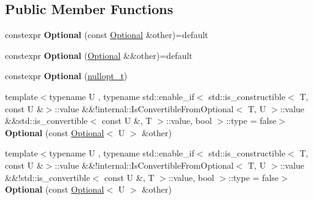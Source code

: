 \subsection*{Public Member Functions}
\begin{DoxyCompactItemize}
\item 
\mbox{\label{classv8_1_1base_1_1Optional_a40c311fae36751117f36cbe251bdbb6a}} 
constexpr {\bfseries Optional} (const \mbox{\hyperlink{classv8_1_1base_1_1Optional}{Optional}} \&other)=default
\item 
\mbox{\label{classv8_1_1base_1_1Optional_a4d5a0f84ed1678dc6647edc8127300c3}} 
constexpr {\bfseries Optional} (\mbox{\hyperlink{classv8_1_1base_1_1Optional}{Optional}} \&\&other)=default
\item 
\mbox{\label{classv8_1_1base_1_1Optional_aff776d9111417521b84aea3c36e5ff17}} 
constexpr {\bfseries Optional} (\mbox{\hyperlink{structv8_1_1base_1_1nullopt__t}{nullopt\+\_\+t}})
\item 
\mbox{\label{classv8_1_1base_1_1Optional_a4b6258b007a59720f13b3a0d7157b8bd}} 
{\footnotesize template$<$typename U , typename std\+::enable\+\_\+if$<$ std\+::is\+\_\+constructible$<$ T, const U \&$>$\+::value \&\&!internal\+::\+Is\+Convertible\+From\+Optional$<$ T, U $>$\+::value \&\&std\+::is\+\_\+convertible$<$ const U \&, T $>$\+::value, bool $>$\+::type  = false$>$ }\\{\bfseries Optional} (const \mbox{\hyperlink{classv8_1_1base_1_1Optional}{Optional}}$<$ U $>$ \&other)
\item 
\mbox{\label{classv8_1_1base_1_1Optional_a4b6258b007a59720f13b3a0d7157b8bd}} 
{\footnotesize template$<$typename U , typename std\+::enable\+\_\+if$<$ std\+::is\+\_\+constructible$<$ T, const U \&$>$\+::value \&\&!internal\+::\+Is\+Convertible\+From\+Optional$<$ T, U $>$\+::value \&\&!std\+::is\+\_\+convertible$<$ const U \&, T $>$\+::value, bool $>$\+::type  = false$>$ }\\{\bfseries Optional} (const \mbox{\hyperlink{classv8_1_1base_1_1Optional}{Optional}}$<$ U $>$ \&other)
\item 
\mbox{\label{classv8_1_1base_1_1Optional_a2db7ed6a130655410a1ef7f05124587a}} 

\end{DoxyCompactItemize}
